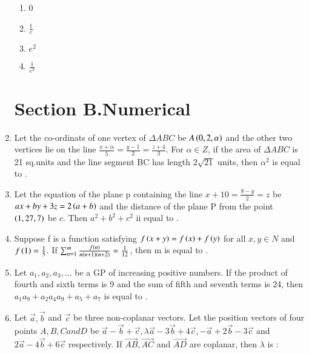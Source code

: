 \documentclass[journal]{IEEEtran}
\begin{document}
\begin{enumerate}[start=16]
\begin{enumerate}
    \item 0
    \item $\frac{1}{e}$
    \item $e^{2}$
    \item $\frac{1}{e^{2}}$
\end{enumerate}
\section{Section B.Numerical}
\item Let the co-ordinats of one vertex of $\Delta ABC$ be $A\left(0, 2, \alpha\right)$ and the other two vertices lie on the line $\frac{x+\alpha}{5}=\frac{y-1}{2}=\frac{z+4}{3}$. For $\alpha\in Z$, if the area of $\Delta ABC$ is 21 sq.units and the line segment BC has length $2\sqrt{21}$ units, then $\alpha^{2}$ is equal to \underline{\hspace{2.5cm}}.\\
\item Let the equation of the plane p containing the line $x+10=\frac{8-y}{2}=z$ be $ax+by+3z=2\left(a+b\right)$ and the distance of the plane P from the point $\left(1, 27, 7\right)$ be $c$. Then $a^{2}+b^{2}+c^{2}$ ii equal to \underline{\hspace{2.5cm}}.\\
\item Suppose f is a function satisfying $f\left(x+y\right)=f\left(x\right)+f\left(y\right)$ for all $x,y \in N$ and $f\left(1\right)=\frac{1}{5}$. If $\sum_{n=1}^{m}\frac{f\left(n\right)}{n\left(n+1\right)\left(n+2\right)}=\frac{1}{12}$, then m is equal to \underline{\hspace{2.5cm}}.\\
\item Let $a_{1},a_{2},a_{3},\ldots$ be a GP of increasing positive numbers. If the product of fourth and sixth terms is 9 and the sum of fifth and seventh terms is 24, then $a_{1}a_{9}+a_{2}a_{4}a_{9}+a_{5}+a_{7}$ is equal to \underline{\hspace{2.5cm}}.\\
\item Let $\overrightarrow{a},\overrightarrow{b}$ and $\overrightarrow{c}$ be three non-coplanar vectors. Let the position vectors of four points $A, B, C and D$ be $\overrightarrow{a}-\overrightarrow{b}+\overrightarrow{c},\lambda\overrightarrow{a}-3\overrightarrow{b}+4\overrightarrow{c},-\overrightarrow{a}+2\overrightarrow{b}-3\overrightarrow{c}$ and $2\overrightarrow{a}-4\overrightarrow{b}+6\overrightarrow{c}$ respectively. If $\overrightarrow{AB},\overrightarrow{AC}$ and $\overrightarrow{AD}$ are coplanar, then $\lambda$ is $\colon$\\

\end{enumerate}
\end{document}
